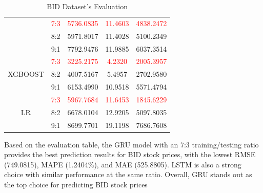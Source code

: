 \documentclass{ieeeojies}
\begin{document}
\begin{table}[H]
\begin{tabular}{|c|c|c|c|c|}
         & \textcolor{red}{7:3} & \textcolor{red}{5736.0835} & \textcolor{red}{11.4603} & \textcolor{red}{4838.2472} \\
         & 8:2 & 5971.8017 & 11.4028 & 5100.2349 \\ 
         & 9:1 & 7792.9476 & 11.9885 & 6037.3514 \\
         \hline
         \multirow{3}{*}{XGBOOST} 
         & \textcolor{red}{7:3} & \textcolor{red}{3225.2175} & \textcolor{red}{4.2320} & \textcolor{red}{2005.3957} \\ 
         & 8:2 & 4007.5167 & 5.4957 & 2702.9580 \\ 
         & 9:1 & 6153.4990 & 10.9518 & 5571.4794 \\
         \hline
         \multirow{3}{*}{LR} 
         & \textcolor{red}{7:3} & \textcolor{red}{5967.7684} & \textcolor{red}{11.6453} & \textcolor{red}{1845.6229} \\
         & 8:2 & 6678.0104 & 12.9205 & 5097.8035 \\ 
         & 9:1 & 8699.7701 & 19.1198 & 7686.7608 \\
         \hline
    \end{tabular}
    \caption{BID Dataset's Evaluation}
    \label{vcbdataset}
\end{table}
Based on the evaluation table, the GRU model with an 7:3 training/testing ratio provides the best prediction results for BID stock prices, with the lowest RMSE (749.0815), MAPE (1.2404\%), and MAE (525.8805). LSTM is also a strong choice with similar performance at the same ratio. Overall, GRU stands out as the top choice for predicting BID stock prices
\end{document}
